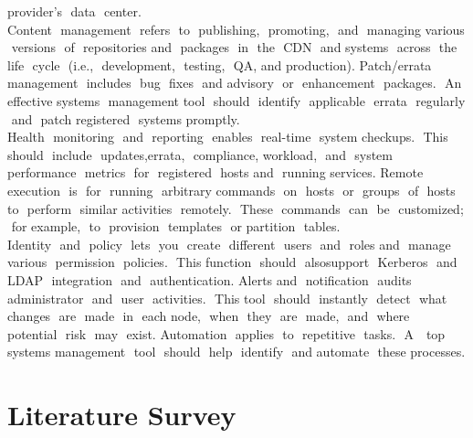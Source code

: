 \documentclass[a4paper,12pt]{report}
\begin{document}
provider's​ ​ data​ ​ center.\\
\newline
Content​ ​ management​ ​ refers​ ​ to​ ​ publishing,​ ​ promoting,​ ​ and​ ​ managing​ ​ various​ ​ versions​ ​ of​ ​ repositories
and​ ​ packages​ ​ in​ ​ the​ ​ CDN​ ​ and​ ​ systems​ ​ across​ ​ the​ ​ life​ ​ cycle​ ​ (i.e.,​ ​ development,​ ​ testing,​ ​ QA,​ ​ and
production).
Patch/errata​ ​ management​ ​ includes​ ​ bug​ ​ fixes​ ​ and​ ​ advisory​ ​ or​ ​ enhancement​ ​ packages.​ ​ An​ ​ effective
systems​ ​ management​ ​ tool​ ​ should​ ​ identify​ ​ applicable​ ​ errata​ ​ regularly​ ​ and​ ​ patch​ ​ registered​ ​ systems promptly.\\
\newline
Health​ ​ monitoring​ ​ and​ ​ reporting​ ​ enables​ ​ real-time​ ​ system​ ​ checkups.​ ​ This​ ​ should​ ​ include​ ​ updates,errata,​ ​ compliance,​ ​ workload,​ ​ and​ ​ system​ ​ performance​ ​ metrics​ ​ for​ ​ registered​ ​ hosts​ ​ and​ ​ running
services.
Remote​ ​ execution​ ​ is​ ​ for​ ​ running​ ​ arbitrary​ ​ commands​ ​ on​ ​ hosts​ ​ or​ ​ groups​ ​ of​ ​ hosts​ ​ to​ ​ perform​ ​ similar
activities​ ​ remotely.​ ​ These​ ​ commands​ ​ can​ ​ be​ ​ customized;​ ​ for​ ​ example,​ ​ to​ ​ provision​ ​ templates​ ​ or
partition​ ​ tables.\\
\newline
Identity​ ​ and​ ​ policy​ ​ lets​ ​ you​ ​ create​ ​ different​ ​ users​ ​ and​ ​ roles​ ​ and​ ​ manage​ ​ various​ ​ permission​ ​ policies.​ ​ This
function​ ​ should​ ​ also​ ​ support​ ​ Kerberos​ ​ and​ ​ LDAP​ ​ integration​ ​ and​ ​ authentication.
Alerts​ ​ and​ ​ notification​ ​ audits​ ​ administrator​ ​ and​ ​ user​ ​ activities.​ ​ This​ ​ tool​ ​ should​ ​ instantly​ ​ detect​ ​ what
changes​ ​ are​ ​ made​ ​ in​ ​ each​ ​ node,​ ​ when​ ​ they​ ​ are​ ​ made,​ ​ and​ ​ where​ ​ potential​ ​ risk​ ​ may​ ​ exist.
Automation​ ​ applies​ ​ to​ ​ repetitive​ ​ tasks.​ ​ A ​ ​ top​ ​ systems​ ​ management​ ​ tool​ ​ should​ ​ help​ ​ identify​ ​ and
automate​ ​ these​ ​ processes.

\chapter{Literature Survey}
\end{document}
